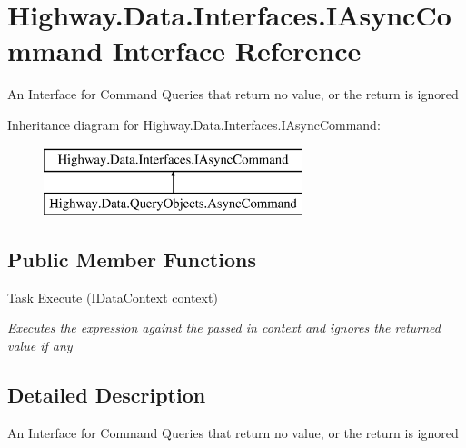 \hypertarget{interface_highway_1_1_data_1_1_interfaces_1_1_i_async_command}{\section{Highway.\-Data.\-Interfaces.\-I\-Async\-Command Interface Reference}
\label{interface_highway_1_1_data_1_1_interfaces_1_1_i_async_command}
}


An Interface for Command Queries that return no value, or the return is ignored  


Inheritance diagram for Highway.\-Data.\-Interfaces.\-I\-Async\-Command\-:\begin{figure}[H]
\begin{center}
\leavevmode
\includegraphics[height=2.000000cm]{interface_highway_1_1_data_1_1_interfaces_1_1_i_async_command}
\end{center}
\end{figure}
\subsection*{Public Member Functions}
\begin{DoxyCompactItemize}
\item 
Task \hyperlink{interface_highway_1_1_data_1_1_interfaces_1_1_i_async_command_a626e4ab4e98afc89f6541347e0b35006}{Execute} (\hyperlink{interface_highway_1_1_data_1_1_interfaces_1_1_i_data_context}{I\-Data\-Context} context)
\begin{DoxyCompactList}\small\item\em Executes the expression against the passed in context and ignores the returned value if any \end{DoxyCompactList}\end{DoxyCompactItemize}


\subsection{Detailed Description}
An Interface for Command Queries that return no value, or the return is ignored 



